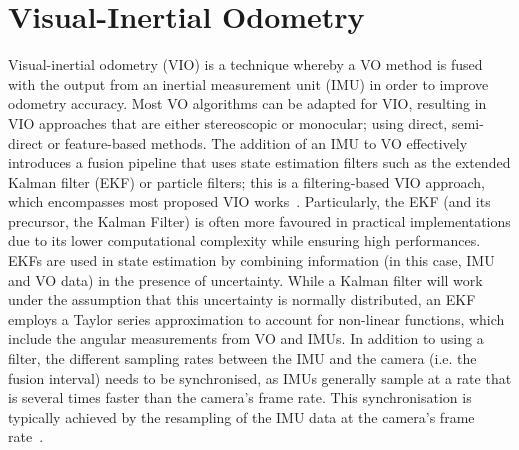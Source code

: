 \section{Visual-Inertial Odometry}\label{sec:3:vio}
Visual-inertial odometry (VIO) is a technique whereby a VO method is fused with the output from an inertial measurement unit (IMU) in order to improve odometry accuracy. Most VO algorithms can be adapted for VIO, resulting in VIO approaches that are either stereoscopic or monocular; using direct, semi-direct or feature-based methods. The addition of an IMU to VO effectively introduces a fusion pipeline that uses state estimation filters such as the extended Kalman filter (EKF) or particle filters; this is a filtering-based VIO approach, which encompasses most proposed VIO works~\cite{gui_review_2015}. Particularly, the EKF (and its precursor, the Kalman Filter) is often more favoured in practical implementations due to its lower computational complexity while ensuring high performances. EKFs are used in state estimation by combining information (in this case, IMU and VO data) in the presence of uncertainty. While a Kalman filter will work under the assumption that this uncertainty is normally distributed, an EKF employs a Taylor series approximation to account for non-linear functions, which include the angular measurements from VO and IMUs. In addition to using a filter, the different sampling rates between the IMU and the camera (i.e. the fusion interval) needs to be synchronised, as IMUs generally sample at a rate that is several times faster than the camera's frame rate. This synchronisation is typically achieved by the resampling of the IMU data at the camera's frame rate~\cite{konolige_large-scale_2010}. 


